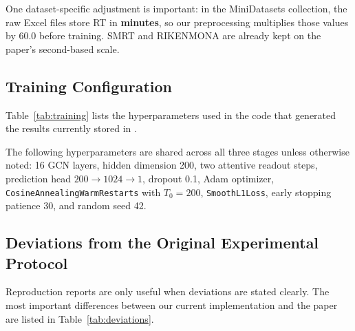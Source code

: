 One dataset-specific adjustment is important: in the MiniDatasets collection, the raw Excel files store RT in \textbf{minutes}, so our preprocessing multiplies those values by \(60.0\) before training. SMRT and RIKENMONA are already kept on the paper's second-based scale.

\subsection{Training Configuration}

Table~\ref{tab:training} lists the hyperparameters used in the code that generated the results currently stored in .

\begin{table}[t]
\centering
\caption{Training settings used for the runs discussed in this report. The MiniDataset comparison uses the direct SMRT-initialized 10-fold runs stored under \texttt{Train/Results/DeepGCNRT/MiniDatasets/}.}
\label{tab:training}
\end{table}

The following hyperparameters are shared across all three stages unless otherwise noted: 16 GCN layers, hidden dimension 200, two attentive readout steps, prediction head \(200 \rightarrow 1024 \rightarrow 1\), dropout 0.1, Adam optimizer, \texttt{CosineAnnealingWarmRestarts} with \(T_0 = 200\), \texttt{SmoothL1Loss}, early stopping patience 30, and random seed 42.

\subsection{Deviations from the Original Experimental Protocol}

Reproduction reports are only useful when deviations are stated clearly. The most important differences between our current implementation and the paper are listed in Table~\ref{tab:deviations}.


